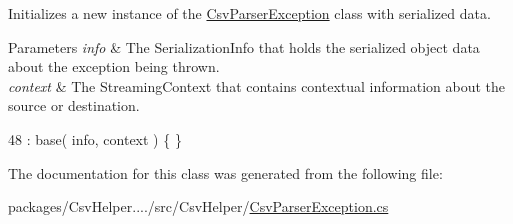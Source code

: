 Initializes a new instance of the \hyperlink{a00049}{Csv\-Parser\-Exception} class with serialized data. 


\begin{DoxyParams}{Parameters}
{\em info} & The Serialization\-Info that holds the serialized object data about the exception being thrown.\\
\hline
{\em context} & The Streaming\-Context that contains contextual information about the source or destination.\\
\hline
\end{DoxyParams}

\begin{DoxyCode}
48 : base( info, context ) \{ \}
\end{DoxyCode}


The documentation for this class was generated from the following file\-:\begin{DoxyCompactItemize}
\item 
packages/\-Csv\-Helper..../src/\-Csv\-Helper/\hyperlink{a00202}{Csv\-Parser\-Exception.\-cs}\end{DoxyCompactItemize}
